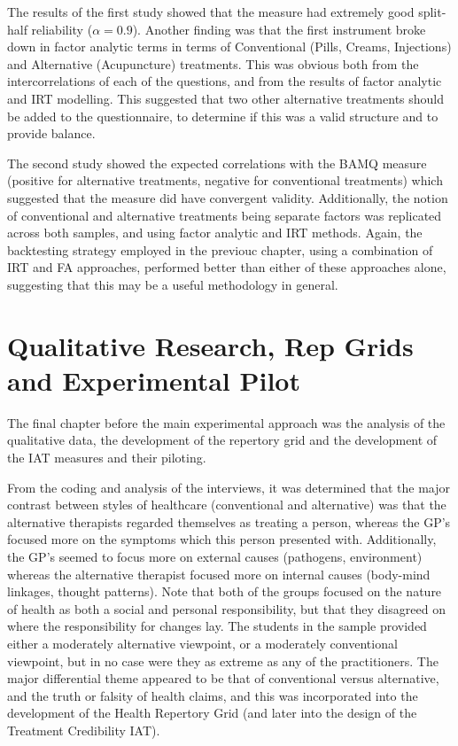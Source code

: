 The results of the first study showed that the measure had extremely good split-half reliability ($ \alpha=0.9$). Another finding was that the first instrument broke down in factor analytic terms in terms of Conventional (Pills, Creams, Injections) and Alternative (Acupuncture) treatments. This was obvious both from the intercorrelations of each of the questions, and from the results of factor analytic and IRT modelling. This suggested that two other alternative treatments should be added to the questionnaire, to determine if this was a valid structure and to provide balance. 

The second study showed the expected correlations  with the BAMQ measure (positive for alternative treatments, negative for conventional treatments) which suggested that the measure did have convergent validity. Additionally, the notion of conventional and alternative treatments being separate factors was replicated across both samples, and using factor analytic and IRT methods. Again, the backtesting strategy employed in the previouc chapter, using a combination of IRT and FA approaches, performed better than either of these approaches alone, suggesting that this may be a useful methodology in general. 


\section{Qualitative Research, Rep Grids and Experimental Pilot}
\label{sec:qual-rese-rep}

The final chapter before the main experimental approach was the analysis of the qualitative data, the development of the repertory grid and the development of the IAT measures and their piloting. 

From the coding and analysis of the interviews, it was determined that the major contrast between styles of healthcare (conventional and alternative) was that the alternative therapists regarded themselves as treating a person, whereas the GP's focused more on the symptoms which this person presented with. Additionally, the GP's seemed to focus more on external causes (pathogens, environment) whereas the alternative therapist focused more on internal causes (body-mind linkages, thought patterns). Note that both of the groups focused on the nature of health as both a social and personal responsibility, but that they disagreed on where the responsibility for changes lay. The students in the sample provided either a moderately alternative viewpoint, or a moderately conventional viewpoint, but in no case were they as extreme as any of the practitioners. The major differential theme appeared to be that of conventional versus alternative, and the truth or falsity of health claims, and this was incorporated into the development of the Health Repertory Grid (and later into the design of the Treatment Credibility IAT). 

